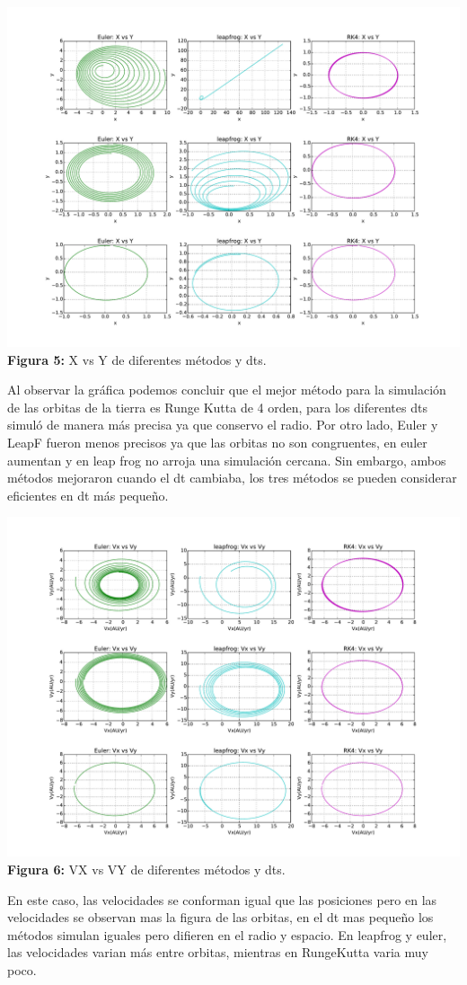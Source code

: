\documentclass[11pt,letterpaper]{exam}
\begin{document}
\begin{center}
\includegraphics[width=16.cm]{XY_met_dt.pdf}
\textbf{Figura 5:}{  X vs Y de diferentes m\'etodos y dts.}
\end{center}
{Al observar la gr\'afica podemos concluir que el mejor m\'etodo para la simulaci\'on de las orbitas de la tierra es Runge Kutta de 4 orden, para los diferentes dts simul\'o de manera m\'as precisa ya que conservo el radio. Por otro lado, Euler y LeapF fueron menos precisos ya que las orbitas no son congruentes, en euler aumentan y en leap frog no arroja una simulaci\'on cercana. Sin embargo, ambos m\'etodos mejoraron cuando el dt cambiaba, los tres m\'etodos se pueden considerar eficientes en dt m\'as pequeño.}

\begin{center}
\includegraphics[width=16.cm]{VxVy_met_dt.pdf}
\textbf{Figura 6:}{  VX vs VY de diferentes m\'etodos y dts.}
\end{center}
{En este caso, las velocidades se conforman igual que las posiciones pero en las velocidades se observan mas la figura de las orbitas, en el dt mas pequeño los m\'etodos simulan iguales pero difieren en el radio y espacio. En leapfrog y euler, las velocidades varian m\'as entre orbitas, mientras en RungeKutta varia muy poco.}
\end{document}
